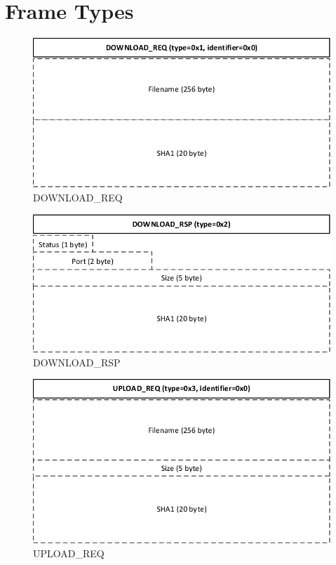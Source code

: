 \documentclass[]{article}
\begin{document}
\section{Frame Types}


\begin{figure}[H]
\centering
\includegraphics[width=\textwidth]{frames/download-req.pdf}
\caption{DOWNLOAD\_REQ}
\label{DOWNLOAD-REQ}
\end{figure}

\begin{figure}[H]
\centering
\includegraphics[width=\textwidth]{frames/download-rsp.pdf}
\caption{DOWNLOAD\_RSP}
\label{DOWNLOAD-RSP}
\end{figure}

\begin{figure}[H]
\centering
\includegraphics[width=\textwidth]{frames/upload-req.pdf}
\caption{UPLOAD\_REQ}
\label{UPLOAD-REQ}
\end{figure}
\end{document}
